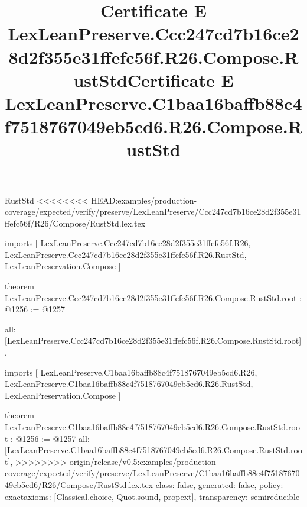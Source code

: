 \begin{lexlean}{RustStd}
<<<<<<<< HEAD:examples/production-coverage/expected/verify/preserve/LexLeanPreserve/Ccc247cd7b16ce28d2f355e31ffefc56f/R26/Compose/RustStd.lex.tex
\title{Certificate E LexLeanPreserve.Ccc247cd7b16ce28d2f355e31ffefc56f.R26.Compose.RustStd}
\begin{coremodule}
imports [
  LexLeanPreserve.Ccc247cd7b16ce28d2f355e31ffefc56f.R26,
  LexLeanPreserve.Ccc247cd7b16ce28d2f355e31ffefc56f.R26.RustStd,
  LexLeanPreservation.Compose
]

theorem LexLeanPreserve.Ccc247cd7b16ce28d2f355e31ffefc56f.R26.Compose.RustStd.root : @1256 := @1257 {
  all: [LexLeanPreserve.Ccc247cd7b16ce28d2f355e31ffefc56f.R26.Compose.RustStd.root],
========
\title{Certificate E LexLeanPreserve.C1baa16baffb88c4f7518767049eb5cd6.R26.Compose.RustStd}
\begin{coremodule}
imports [
  LexLeanPreserve.C1baa16baffb88c4f7518767049eb5cd6.R26,
  LexLeanPreserve.C1baa16baffb88c4f7518767049eb5cd6.R26.RustStd,
  LexLeanPreservation.Compose
]

theorem LexLeanPreserve.C1baa16baffb88c4f7518767049eb5cd6.R26.Compose.RustStd.root : @1256 := @1257 {
  all: [LexLeanPreserve.C1baa16baffb88c4f7518767049eb5cd6.R26.Compose.RustStd.root],
>>>>>>>> origin/release/v0.5:examples/production-coverage/expected/verify/preserve/LexLeanPreserve/C1baa16baffb88c4f7518767049eb5cd6/R26/Compose/RustStd.lex.tex
  class: false,
  generated: false,
  policy: exact{axioms: [Classical.choice, Quot.sound, propext]},
  transparency: semireducible
}


\end{coremodule}}
\end{coremodule}
\end{lexlean}
